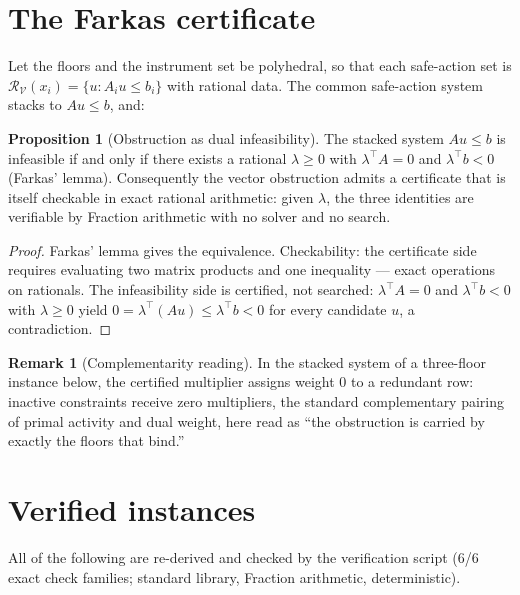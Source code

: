 \documentclass[10pt,twocolumn]{article}
\theoremstyle{definition}
\newtheorem{proposition}{Proposition}
\newtheorem{remark}{Remark}
\begin{document}
\section{The Farkas certificate}

Let the floors and the instrument set be polyhedral, so that each
safe-action set is $\mathcal R_{\mathcal V}(x_i)=\{u: A_i u\le b_i\}$ with
rational data. The common safe-action system stacks to $Au\le b$, and:

\begin{proposition}[Obstruction as dual infeasibility]
\label{prop:farkas}
The stacked system $Au\le b$ is infeasible if and only if there exists a
rational $\lambda\ge 0$ with $\lambda^{\top}A=0$ and $\lambda^{\top}b<0$
(Farkas' lemma). Consequently the vector obstruction admits a certificate
that is itself checkable in exact rational arithmetic: given $\lambda$, the
three identities are verifiable by Fraction arithmetic with no solver and
no search.
\end{proposition}
\begin{proof}
Farkas' lemma gives the equivalence. Checkability: the certificate side
requires evaluating two matrix products and one inequality --- exact
operations on rationals. The infeasibility side is certified, not searched:
$\lambda^{\top}A=0$ and $\lambda^{\top}b<0$ with $\lambda\ge0$ yield
$0=\lambda^{\top}(Au)\le\lambda^{\top}b<0$ for every candidate $u$, a
contradiction.
\end{proof}

\begin{remark}[Complementarity reading]
In the stacked system of a three-floor instance below, the certified
multiplier assigns weight $0$ to a redundant row: inactive constraints
receive zero multipliers, the standard complementary pairing of primal
activity and dual weight, here read as ``the obstruction is carried by
exactly the floors that bind.''
\end{remark}

\section{Verified instances}

All of the following are re-derived and checked by the verification script
(\textsf{6/6 exact check families}; standard library, Fraction arithmetic,
deterministic).
\end{document}
